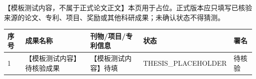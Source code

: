 
【模板测试内容，不属于正式论文正文】本页用于占位。正式版本应只填写已核验来源的论文、专利、项目、奖励或其他科研成果；未确认状态不得猜测。

\begin{longtable}{p{}p{}p{}p{}p{}}
\toprule
序号 & 成果名称 & 刊物/项目/专利信息 & 状态 & 署名 \\
\midrule
1 & 【模板测试内容】待核验成果 & 【模板测试内容】待填 & THESIS\_PLACEHOLDER & 待核验 \\
\bottomrule
\end{longtable}

